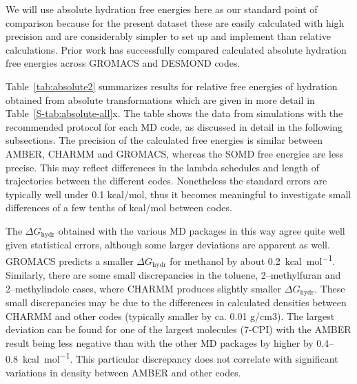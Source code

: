 \documentclass[journal=jctcce,manuscript=article]{achemso}
\begin{document}
We will use absolute hydration free energies here as our standard point of 
comparison because for the present dataset these are easily calculated with high precision \cite{doi:10.1021/acs.jced.7b00104} %
and are considerably simpler to set up and implement than relative calculations.
Prior work has successfully compared calculated absolute hydration free energies across GROMACS and DESMOND
codes.~\cite{klimovich_predicting_2010} 

Table~\ref{tab:absolute2} summarizes results for relative free energies of 
hydration obtained from absolute transformations which are given in more detail in Table~\ref{S-tab:absolute-all}x.  The table shows the data 
from simulations with the recommended protocol for each MD code, as discussed in detail in the 
following subsections. 
The  precision of the calculated free energies is similar between AMBER, CHARMM and GROMACS, whereas the SOMD free energies are  less precise. This may reflect differences in the lambda schedules and length of trajectories between the different codes. Nonetheless the standard errors are typically well under 0.1 kcal/mol, thus it becomes meaningful to investigate small differences of a few tenths of kcal/mol between codes. 

The $\Delta G_{\mathrm{hydr}}$ 
obtained with the various MD packages in 
this way agree quite well given statistical errors, although some larger deviations are apparent as 
well.  GROMACS predicts a smaller $\Delta G_{\mathrm{hydr}}$ for methanol by about \SI{+0.2}{kcal.mol^{-1}}.  Similarly, there are some small discrepancies in the toluene, 2--methylfuran and 2--methylindole cases, where CHARMM produces slightly smaller $\Delta G_{\mathrm{hydr}}$. These small discrepancies may be due to the differences in calculated densities between CHARMM and other codes (typically smaller by ca. 0.01 g/cm3). 
The largest deviation can be found for one of the largest
molecules (7-CPI) with the AMBER result being less negative than with the other MD packages by higher by 0.4--\SI{0.8}{kcal.mol^{-1}}. This particular discrepancy does not correlate with significant variations in density between AMBER and other codes. 
\end{document}
